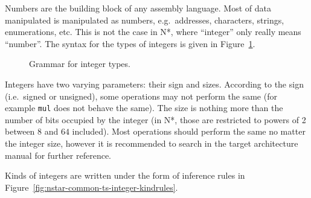 Numbers are the building block of any assembly language. Most of data manipulated is manipulated as numbers, e.g.\ addresses, characters, strings, enumerations, etc.
This is not the case in N*, where ``integer''  only really means ``number''.
The syntax for the types of integers is given in Figure~\ref{fig:nstar-common-ts-integer-syntax}.

\begin{figure}[htb]
  \centering
  \caption{Grammar for integer types.}
  \label{fig:nstar-common-ts-integer-syntax}
\end{figure}

Integers have two varying parameters: their sign and sizes.
According to the sign (i.e.\ signed or unsigned), some operations may not perform the same (for example \texttt{mul} does not behave the same).
The size is nothing more than the number of bits occupied by the integer (in N*, those are restricted to powers of 2 between $8$ and $64$ included).
Most operations should perform the same no matter the integer size, however it is recommended to search in the target architecture manual for further reference.

Kinds of integers are written under the form of inference rules in Figure~\ref{fig:nstar-common-ts-integer-kindrules}.


